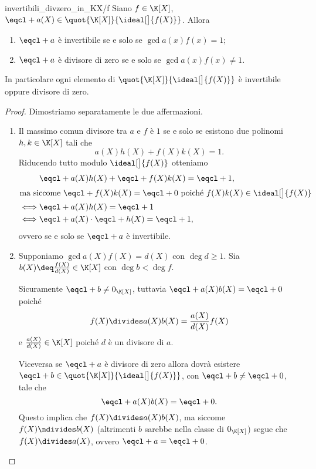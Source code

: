 \begin{proposition}
    {invertibili_divzero_in_KX/f}
    Siano $f \in \K[X]$, $\eqcl+{a(X)} \in \quot{\K[X]}{\ideal[\big]{f(X)}}$.
    Allora \begin{enumerate}[label={(\roman*)}]
        \item $\eqcl+ a$ è invertibile se e solo se $\gcd{a(x)}{f(x)} = 1$;
        \item $\eqcl+ a$ è divisore di zero se e solo se $\gcd{a(x)}{f(x)} \neq 1$.
    \end{enumerate}
    In particolare ogni elemento di $\quot{\K[X]}{\ideal[\big]{f(X)}}$ è invertibile oppure divisore di zero.
\end{proposition}
\begin{proof}
    Dimostriamo separatamente le due affermazioni.
    \begin{enumerate}[label={(\roman*)}]
        \item Il massimo comun divisore tra $a$ e $f$ è $1$ se e solo se esistono due polinomi $h, k \in \K[X]$ tali che\[
            a(X)h(X) + f(X)k(X) = 1.    
        \] Riducendo tutto modulo $\ideal[\big]{f(X)}$ otteniamo \begin{align*}
            &\eqcl+{a(X)h(X)} + \eqcl+{f(X)k(X)} = \eqcl+ 1,\\
            \intertext{ma siccome $\eqcl+{f(X)k(X)} = \eqcl+ 0$ poiché $f(X)k(X) \in \ideal[\big]{f(X)}$}
            \iff &\eqcl+{a(X)h(X)} = \eqcl+ 1 \\
            \iff &\eqcl+{a(X)}\cdot\eqcl+{h(X)} = \eqcl+ 1,
        \end{align*} ovvero se e solo se $\eqcl+ a$ è invertibile.
        \item Supponiamo $\gcd{a(X)}{f(X)} = d(X)$ con $\deg d \geq 1$. Sia $b(X) \deq \frac{f(X)}{d(X)} \in \K[X]$ con $\deg b < \deg f$.
        
        Sicuramente $\eqcl+ b \neq 0_{\K[X]}$, tuttavia $\eqcl+{a(X)b(X)} = \eqcl+ 0$ poiché \[
            f(X) \divides a(X)b(X) = \frac{a(X)}{d(X)}f(X)
        \] e $\frac{a(X)}{d(X)} \in \K[X]$ poiché $d$ è un divisore di $a$.

        Viceversa se $\eqcl+ a$ è divisore di zero allora dovrà esistere $\eqcl+ b \in \quot{\K[X]}{\ideal[\big]{f(X)}}$, con $\eqcl+ b \neq \eqcl+ 0$, tale che \[
            \eqcl+{a(X)b(X)} = \eqcl+ 0.    
        \] Questo implica che $f(X) \divides a(X)b(X)$, ma siccome $f(X) \ndivides b(X)$ (altrimenti $b$ sarebbe nella classe di $0_{\K[X]}$) segue che $f(X) \divides a(X)$, ovvero $\eqcl+ a = \eqcl+ 0$.
    \end{enumerate}
\end{proof}


